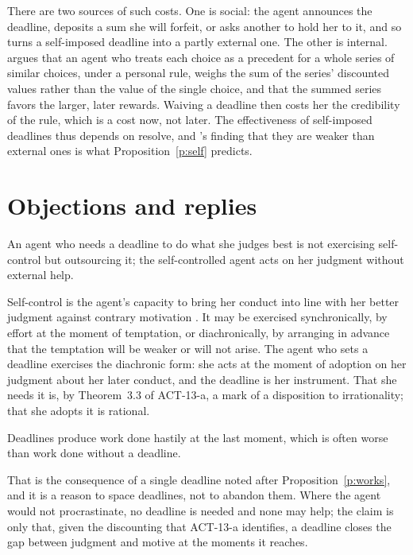 \documentclass{situationist-preprint}
\begin{document}
There are two sources of such costs. One is social: the agent announces the deadline, deposits a sum she will forfeit, or asks another to hold her to it, and so turns a self-imposed deadline into a partly external one. The other is internal. \citet{Ainslie1992} argues that an agent who treats each choice as a precedent for a whole series of similar choices, under a personal rule, weighs the sum of the series' discounted values rather than the value of the single choice, and that the summed series favors the larger, later rewards. Waiving a deadline then costs her the credibility of the rule, which is a cost now, not later. The effectiveness of self-imposed deadlines thus depends on resolve, and \citet{Ariely2002}'s finding that they are weaker than external ones is what Proposition~\ref{p:self} predicts.

\section{Objections and replies}

\begin{objection}
An agent who needs a deadline to do what she judges best is not exercising self-control but outsourcing it; the self-controlled agent acts on her judgment without external help.
\end{objection}

\begin{reply}
Self-control is the agent's capacity to bring her conduct into line with her better judgment against contrary motivation \citep{Elster1979}. It may be exercised synchronically, by effort at the moment of temptation, or diachronically, by arranging in advance that the temptation will be weaker or will not arise. The agent who sets a deadline exercises the diachronic form: she acts at the moment of adoption on her judgment about her later conduct, and the deadline is her instrument. That she needs it is, by Theorem~3.3 of ACT-13-a, a mark of a disposition to irrationality; that she adopts it is rational.
\end{reply}

\begin{objection}
Deadlines produce work done hastily at the last moment, which is often worse than work done without a deadline.
\end{objection}

\begin{reply}
That is the consequence of a single deadline noted after Proposition~\ref{p:works}, and it is a reason to space deadlines, not to abandon them. Where the agent would not procrastinate, no deadline is needed and none may help; the claim is only that, given the discounting that ACT-13-a identifies, a deadline closes the gap between judgment and motive at the moments it reaches.
\end{reply}
\end{document}
